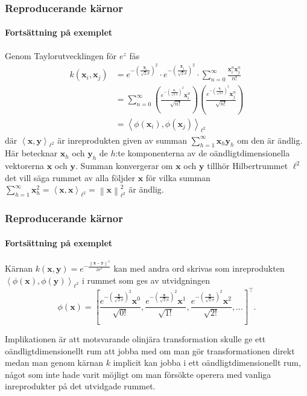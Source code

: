 \documentclass{beamer}
\theoremstyle{definition}
\theoremstyle{remark}
\newcommand{\bfx}{\mathbf{x}}
\newcommand{\bfy}{\mathbf{y}}
\newcommand{\llangle}{\left\langle}
\newcommand{\rrangle}{\right\rangle}
\newcommand{\inner}[2]{\llangle #1, #2 \rrangle}
\begin{document}
\begin{frame}
\frametitle{Reproducerande kärnor}
\framesubtitle{Fortsättning på exemplet}
Genom Taylorutvecklingen för $e^{z}$ fås
\begin{align*}
k\left(\bfx_i, \bfx_j\right)&= e^{-\left(\frac{\bfx_i}{\sqrt{2}\sigma}\right)^2}\cdot e^{-\left(\frac{\bfx_j}{\sqrt{2}\sigma}\right)^2}\cdot \sum_{n=0}^{\infty}\frac{\bfx_i^n\bfx_j^n}{n!}\\
&= \sum_{n=0}^{\infty} \left(\frac{e^{-\left(\frac{\bfx_i}{\sqrt{2}\sigma}\right)^2} \bfx_i^n}{\sqrt{n!}}\right)\left(\frac{e^{-\left(\frac{\bfx_j}{\sqrt{2}\sigma}\right)^2} \bfx_j^n}{\sqrt{n!}}\right)\\
&= \inner{\phi\left(\bfx_i\right)}{\phi\left(\bfx_j\right)}_{\ell^2}
\end{align*}
där $\inner{\bfx}{\bfy}_{\ell^2}$ är inreprodukten given av summan $\sum_{h=1}^{\infty}\bfx_h\bfy_h$ om den är ändlig. Här betecknar $\bfx_h$ och $\bfy_h$ de $h$:te komponenterna av de oändligtdimensionella vektorerna $\bfx$ och $\bfy$. Summan konvergerar om $\bfx$ och $\bfy$ tillhör Hilbertrummet $\ell^2$ det vill säga rummet av alla följder $\bfx$ för vilka summan $\sum_{h=1}^{\infty}\bfx_h^2=\inner{\bfx}{\bfx}_{\ell^2}=\left\|\bfx\right\|_{\ell^2}^2$ är ändlig.
\end{frame}

\begin{frame}
\frametitle{Reproducerande kärnor}
\framesubtitle{Fortsättning på exemplet}
Kärnan $k\left(\bfx, \bfy\right)=e^{-\frac{\left\| \bfx-\bfy\right\|^2}{2\sigma^2}}$ kan med andra ord skrivas som inreprodukten $\inner{\phi\left(\bfx\right)}{\phi\left(\bfy\right)}_{\ell^2}$ i rummet som ges av utvidgningen
\begin{equation*}
\phi\left(\bfx\right)=\left[\frac{e^{-\left(\frac{\bfx}{\sqrt{2}\sigma}\right)^2} \bfx^0}{\sqrt{0!}}, \frac{e^{-\left(\frac{\bfx}{\sqrt{2}\sigma}\right)^2} \bfx^1}{\sqrt{1!}}, \frac{e^{-\left(\frac{\bfx}{\sqrt{2}\sigma}\right)^2} \bfx^2}{\sqrt{2!}}, \dots\right]^\intercal.
\end{equation*}

Implikationen är att motsvarande olinjära transformation skulle ge ett oändligtdimensionellt rum att jobba med om man gör transformationen direkt medan man genom kärnan $k$ implicit kan jobba i ett oändligtdimensionellt rum, något som inte hade varit möjligt om man försökte operera med vanliga inreprodukter på det utvidgade rummet.
\end{frame}
\end{document}
